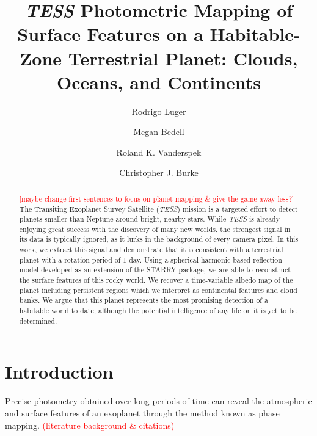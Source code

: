\documentclass[modern]{aastex62}
\newcommand{\TESS}{\emph{TESS}\xspace}
\newcommand{\todo}[1]{\textcolor{red}{#1}}
\begin{document}
\title{\TESS Photometric Mapping of Surface Features on a Habitable-Zone Terrestrial Planet: Clouds, Oceans, and Continents}

\author[0000-0002-0296-3826]{Rodrigo Luger}
%
\author[0000-0002-9328-5652]{Megan Bedell}
%
\author{Roland K. Vanderspek}
%
\author{Christopher J. Burke}

\begin{abstract}
\todo{[maybe change first sentences to focus on planet mapping \& give the game away less?]}
The Transiting Exoplanet Survey Satellite (\TESS) mission is a targeted effort to detect planets smaller than Neptune around bright, nearby stars. 
While \TESS is already enjoying great success with the discovery of many new worlds, the strongest signal in its data is typically ignored, as it lurks in the background of every camera pixel. 
In this work, we extract this signal and demonstrate that it is consistent with a terrestrial planet with a rotation period of 1 day. 
Using a spherical harmonic-based reflection model developed as an extension of the STARRY package, we are able to reconstruct the surface features of this rocky world. 
We recover a time-variable albedo map of the planet including persistent regions which we interpret as continental features and cloud banks. 
We argue that this planet represents the most promising detection of a habitable world to date, although the potential intelligence of any life on it is yet to be determined.
\end{abstract}


\section{Introduction}
\label{sec:intro}

Precise photometry obtained over long periods of time can reveal the atmospheric and surface features of an exoplanet through the method known as phase mapping. \todo{(literature background \& citations)}
\end{document}
